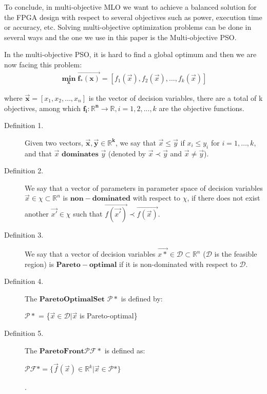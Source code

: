 \documentclass[11pt, runningheads,a4paper]{llncs}
\begin{document}
To conclude, in multi-objective MLO we want to achieve a balanced solution for the FPGA design with respect to several objectives such as power, execution time or accuracy, etc.  Solving multi-objective optimization problems can be done in several ways and the one we use in this paper is the Multi-objective PSO.

In the multi-objective PSO, it is hard to find a global optimum and then we are now facing this problem:
\begin{align} 
\label{eq:mo1}
\mathbf{\min_x\overrightarrow{f_*(x)}}=[ f_1(\overrightarrow{x} ),f_2 (\overrightarrow{x} ),\ldots,f_k (\overrightarrow{x} ) ]
\end{align} 

where $ \mathbf{\overrightarrow{x}}=[x_1,x_2,\ldots,x_n] $ is the vector of decision variables, there are a total of k objectives, among which $\mathbf{f_i: \mathbb{R}^n \to \mathbb{R} }, i=1,2,...,k$ are the objective functions.

\begin{description}
  \item[Definition 1.] Given two vectors, $\mathbf{\overrightarrow{x}, \overrightarrow{y} \in \mathbb{R}^k}$, we say that $\overrightarrow{x} \leq \overrightarrow{y}$ if $x_i \leq y_i$ for $i = 1, \dots, k$, and that $\overrightarrow{x}$ $\mathbf{dominates}$  $\overrightarrow{y}$ (denoted by $\overrightarrow{x} \prec \overrightarrow{y}$ and $\overrightarrow{x} \neq \overrightarrow{y}$).
\\
  \item[Definition 2.] We say that a vector of parameters in parameter space of decision variables $\overrightarrow{x} \in \chi \subset \mathbb{R}^n$ is $\mathbf{non-dominated}$ with respect to $\chi$, if there does not exist another $\overrightarrow{x'} \in \chi$ such that $\overrightarrow{f(\overrightarrow{x'})} \prec  \overrightarrow{f(\overrightarrow{x})}$.
\\
  \item[Definition 3.] We say that a vector of decision variables $\overrightarrow{x*} \in \mathcal{D} \subset \mathbb{R}^n$ ($\mathcal{D}$ is the feasible region) is $\mathbf{Pareto-optimal}$ if it is non-dominated with respect to $\mathcal{D}$.
\\
 \item[Definition 4.] The $\mathbf{Pareto Optimal Set}$  $\mathcal{P}*$ is defined by:
\begin{center} 
$\mathcal{P}*$ = \{$\overrightarrow{x} \in \mathcal{D} | \overrightarrow{x}$ is Pareto-optimal\}
\end{center}

 \item[Definition 5.] The $\mathbf{Pareto Front}  \mathcal{PF}*$ is defined as:
\begin{center} 
$ \mathcal{PF}*= \{\overrightarrow{f}(\overrightarrow{x}) \in  \mathbb{R}^k | \overrightarrow{x} \in \mathcal{P}*\}$
\end{center}.
\end{description}
\end{document}
